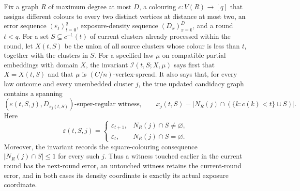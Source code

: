 \begin{definition}
Fix a graph $R$ of maximum degree at most $D$, a colouring
$c:V(R)\to[q]$ that assigns different colours to every two distinct
vertices at distance at most two, an error sequence
$(\varepsilon_t)_{t=0}^{q}$, exposure-density sequence $(D_x)_{x=0}^D$,
and a round $t<q$.  For a set $S\subseteq c^{-1}(t)$ of current clusters
already processed within the round, let $X(t,S)$ be the union of all source
clusters whose colour is less than $t$, together with the clusters in $S$.
For a specified law $\mu$ on compatible partial embeddings with domain $X$,
the invariant $\mathcal I(t,S;X,\mu)$ says first that $X=X(t,S)$ and that
$\mu$ is $(C/n)$-vertex-spread.  It also says that, for every law
outcome and every unembedded cluster $j$, the true updated candidacy graph
contains a spanning
\[
  (\varepsilon(t,S,j),D_{x_j(t,S)})\text{-super-regular witness},
  \qquad
  x_j(t,S)=|N_R(j)\cap(\{k:c(k)<t\}\cup S)|.
\]
Here
\[
 \varepsilon(t,S,j)=
 \begin{cases}
   \varepsilon_{t+1},&N_R(j)\cap S\ne\varnothing,\\
   \varepsilon_t,&N_R(j)\cap S=\varnothing.
 \end{cases}
\]
Moreover, the invariant records the square-colouring consequence
$|N_R(j)\cap S|\leq1$ for every such $j$.  Thus a witness touched earlier in
the current round has the next-round error, an untouched witness retains the
current-round error, and in both cases its density coordinate is exactly its
actual exposure coordinate.
\end{definition}
